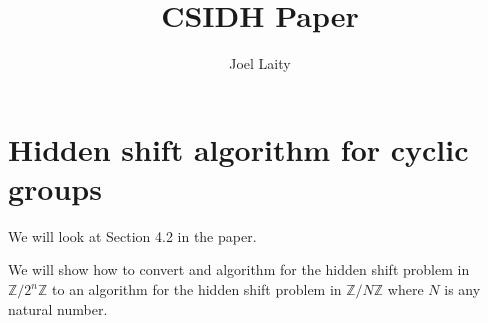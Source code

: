 \documentclass[10pt]{article}
\title{CSIDH Paper}
\author{Joel Laity}
\theoremstyle{plain}
\newtheorem{definition}[theorem]{Definition}
\theoremstyle{definition}
\newcommand{\Z}{\mathbb{Z}}
\newcommand{\Q}{\mathbb{Q}}
\begin{document}
\maketitle
\tableofcontents


\section*{Hidden shift algorithm for cyclic groups}

We will look at Section 4.2 in the paper.

We will show how to convert and algorithm for the hidden shift problem in \( \Z / 2^n \Z \) to an algorithm for the hidden shift problem in \( \Z / N\Z \) where \( N \) is any natural number.
\end{document}
